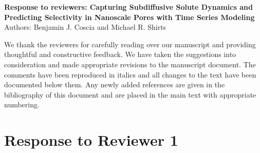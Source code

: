 \documentclass{article}
\begin{document}
\graphicspath{{./figures/}}

\begin{center}
\textbf{Response to reviewers: Capturing Subdiffusive Solute Dynamics and Predicting
Selectivity in Nanoscale Pores with Time Series Modeling} \\
Authors: Benjamin J. Coscia and Michael R. Shirts
\end{center}

We thank the reviewers for carefully reading over our manuscript and providing
thoughtful and constructive feedback. We have taken the suggestions into consideration 
and made appropriate revisions to the manuscript document. The comments have been reproduced
in italics and all changes to the text have been documented below them. Any newly added
references are given in the bibliography of this document and are placed in the main 
text with appropriate numbering.

\section*{Response to Reviewer 1}
\end{document}
